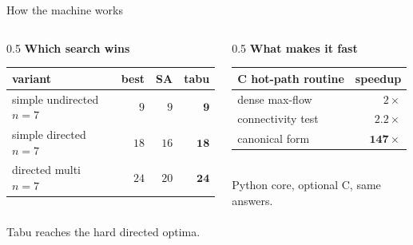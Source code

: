 \documentclass[aspectratio=1610,11pt]{beamer}
\begin{document}
\begin{frame}{How the machine works}
\vfill
\begin{columns}[t,onlytextwidth]
  \begin{column}{0.5\textwidth}\centering
    {\bfseries\color{KULblauw1}Which search wins}\\[10pt]
    \footnotesize
    \begin{tabular}{lrrr}
      \toprule
      variant & best & SA & tabu \\
      \midrule
      simple undirected $n{=}7$ & $9$  & $9$  & $\mathbf{9}$ \\
      simple directed $n{=}7$   & $18$ & $16$ & $\mathbf{18}$ \\
      directed multi $n{=}7$    & $24$ & $20$ & $\mathbf{24}$ \\
      \bottomrule
    \end{tabular}\\[10pt]
    {\footnotesize\color{black!65}Tabu reaches the hard directed optima.}
  \end{column}
  \begin{column}{0.5\textwidth}\centering
    {\bfseries\color{KULblauw1}What makes it fast}\\[10pt]
    \footnotesize
    \begin{tabular}{lr}
      \toprule
      C hot-path routine & speedup \\
      \midrule
      dense max-flow      & $2\times$ \\
      connectivity test   & $2.2\times$ \\
      canonical form      & $\mathbf{147\times}$ \\
      \bottomrule
    \end{tabular}\\[10pt]
    {\footnotesize\color{black!65}Python core, optional C, same answers.}
  \end{column}
\end{columns}
\vfill
\end{frame}
\end{document}
